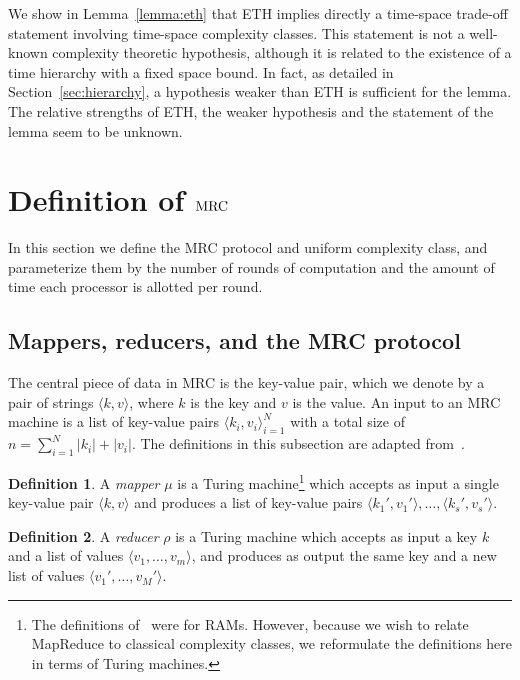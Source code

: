 \documentclass[11pt]{article}
\theoremstyle{definition}
\newtheorem{defn}{Definition}
\theoremstyle{remark}
\newcommand{\mrc}{\textup{MRC}}
\begin{document}
We show in Lemma~\ref{lemma:eth} that ETH implies directly a time-space
trade-off statement involving time-space complexity classes. This statement is
not a well-known complexity theoretic hypothesis, although it is related to the
existence of a time hierarchy with a fixed space bound. In fact, as detailed in
Section~\ref{sec:hierarchy}, a hypothesis weaker than ETH is sufficient for the
lemma. The relative strengths of ETH, the weaker hypothesis and the statement
of the lemma seem to be unknown.

\section{Definition of $\mrc$} \label{sec:definition}

In this section we define the MRC protocol and uniform complexity class, and
parameterize them by the number of rounds of computation and the amount of time
each processor is allotted per round.

\subsection{Mappers, reducers, and the MRC protocol}

The central piece of data in MRC is the key-value pair, which we denote by a
pair of strings $\langle k, v \rangle$, where $k$ is the key and $v$ is the
value. An input to an MRC machine is a list of key-value pairs $\langle k_i,
v_i \rangle_{i=1}^N$ with a total size of $n = \sum_{i=1}^N |k_i| + |v_i|$.
The definitions in this subsection are adapted from~\cite{Karloff10}.

\begin{defn}
A \emph{mapper} $\mu$ is a Turing machine\footnote{The definitions
of~\cite{Karloff10} were for RAMs. However, because we wish to relate MapReduce
to classical complexity classes, we reformulate the definitions here in terms
of Turing machines.} which accepts as input a single key-value pair $\langle k,
v \rangle$ and produces a list of key-value pairs $\langle k_1', v_1' \rangle,
\dots, \langle k_s', v_s' \rangle$. \end{defn}

\begin{defn}
A \emph{reducer} $\rho$ is a Turing machine which accepts as input a key $k$
and a list of values $\langle v_1 , \dots, v_m \rangle$, and produces as output
the same key and a new list of values $\langle v_1', \dots, v_M' \rangle$.
\end{defn}
\end{document}
